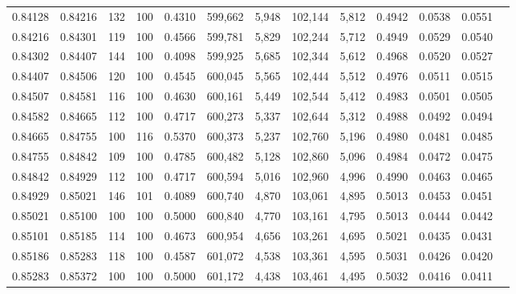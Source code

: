 \begin{tabular}{rrrrrrrrrrrrr}
0.84128 & 0.84216 &   132 & 100 &                                     0.4310 & 599,662 &   5,948 & 102,144 &   5,812 & 0.4942 & 0.0538 & 0.0551 \\
0.84216 & 0.84301 &   119 & 100 &                                     0.4566 & 599,781 &   5,829 & 102,244 &   5,712 & 0.4949 & 0.0529 & 0.0540 \\
0.84302 & 0.84407 &   144 & 100 &                                     0.4098 & 599,925 &   5,685 & 102,344 &   5,612 & 0.4968 & 0.0520 & 0.0527 \\
0.84407 & 0.84506 &   120 & 100 &                                     0.4545 & 600,045 &   5,565 & 102,444 &   5,512 & 0.4976 & 0.0511 & 0.0515 \\
0.84507 & 0.84581 &   116 & 100 &                                     0.4630 & 600,161 &   5,449 & 102,544 &   5,412 & 0.4983 & 0.0501 & 0.0505 \\
0.84582 & 0.84665 &   112 & 100 &                                     0.4717 & 600,273 &   5,337 & 102,644 &   5,312 & 0.4988 & 0.0492 & 0.0494 \\
0.84665 & 0.84755 &   100 & 116 &                                     0.5370 & 600,373 &   5,237 & 102,760 &   5,196 & 0.4980 & 0.0481 & 0.0485 \\
0.84755 & 0.84842 &   109 & 100 &                                     0.4785 & 600,482 &   5,128 & 102,860 &   5,096 & 0.4984 & 0.0472 & 0.0475 \\
0.84842 & 0.84929 &   112 & 100 &                                     0.4717 & 600,594 &   5,016 & 102,960 &   4,996 & 0.4990 & 0.0463 & 0.0465 \\
0.84929 & 0.85021 &   146 & 101 &                                     0.4089 & 600,740 &   4,870 & 103,061 &   4,895 & 0.5013 & 0.0453 & 0.0451 \\
0.85021 & 0.85100 &   100 & 100 &                                     0.5000 & 600,840 &   4,770 & 103,161 &   4,795 & 0.5013 & 0.0444 & 0.0442 \\
0.85101 & 0.85185 &   114 & 100 &                                     0.4673 & 600,954 &   4,656 & 103,261 &   4,695 & 0.5021 & 0.0435 & 0.0431 \\
0.85186 & 0.85283 &   118 & 100 &                                     0.4587 & 601,072 &   4,538 & 103,361 &   4,595 & 0.5031 & 0.0426 & 0.0420 \\
0.85283 & 0.85372 &   100 & 100 &                                     0.5000 & 601,172 &   4,438 & 103,461 &   4,495 & 0.5032 & 0.0416 & 0.0411 \\

\end{tabular}
